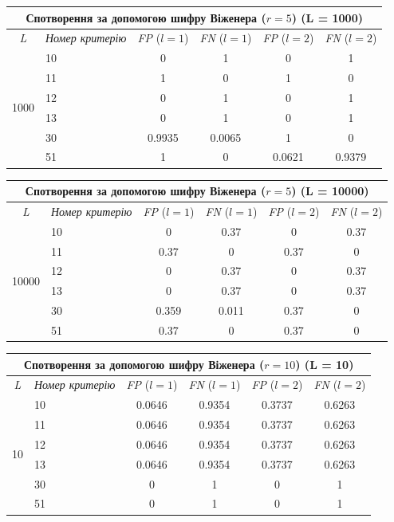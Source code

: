 \documentclass[a4paper,12pt]{article}
\begin{document}
\begin{center}
\renewcommand{\arraystretch}{1.2}
\setlength{\tabcolsep}{6pt}
\begin{tabular}{|c|l||c|c||c|c|}
\hline
\multicolumn{6}{|c|}{Спотворення за допомогою шифру Віженера ($r = 5$) (L = 1000)} \\
\hline
\textit{L} & \textit{Номер критерію} & \textit{FP} ($l=1$) & \textit{FN} ($l=1$) & \textit{FP} ($l=2$) & \textit{FN} ($l=2$) \\
\hline
\multirow{6}{*}{1000} & 10 & 0 & 1 & 0 & 1 \\
 & 11 & 1 & 0 & 1 & 0 \\
 & 12 & 0 & 1 & 0 & 1 \\
 & 13 & 0 & 1 & 0 & 1 \\
 & 30 & 0.9935 & 0.0065 & 1 & 0 \\
 & 51 & 1 & 0 & 0.0621 & 0.9379 \\
\hline
\end{tabular}
\end{center}

\begin{center}
\renewcommand{\arraystretch}{1.2}
\setlength{\tabcolsep}{6pt}
\begin{tabular}{|c|l||c|c||c|c|}
\hline
\multicolumn{6}{|c|}{Спотворення за допомогою шифру Віженера ($r = 5$) (L = 10000)} \\
\hline
\textit{L} & \textit{Номер критерію} & \textit{FP} ($l=1$) & \textit{FN} ($l=1$) & \textit{FP} ($l=2$) & \textit{FN} ($l=2$) \\
\hline
\multirow{6}{*}{10000} & 10 & 0 & 0.37 & 0 & 0.37 \\
 & 11 & 0.37 & 0 & 0.37 & 0 \\
 & 12 & 0 & 0.37 & 0 & 0.37 \\
 & 13 & 0 & 0.37 & 0 & 0.37 \\
 & 30 & 0.359 & 0.011 & 0.37 & 0 \\
 & 51 & 0.37 & 0 & 0.37 & 0 \\
\hline
\end{tabular}
\end{center}

\begin{center}
\renewcommand{\arraystretch}{1.2}
\setlength{\tabcolsep}{6pt}
\begin{tabular}{|c|l||c|c||c|c|}
\hline
\multicolumn{6}{|c|}{Спотворення за допомогою шифру Віженера ($r = 10$) (L = 10)} \\
\hline
\textit{L} & \textit{Номер критерію} & \textit{FP} ($l=1$) & \textit{FN} ($l=1$) & \textit{FP} ($l=2$) & \textit{FN} ($l=2$) \\
\hline
\multirow{6}{*}{10} & 10 & 0.0646 & 0.9354 & 0.3737 & 0.6263 \\
 & 11 & 0.0646 & 0.9354 & 0.3737 & 0.6263 \\
 & 12 & 0.0646 & 0.9354 & 0.3737 & 0.6263 \\
 & 13 & 0.0646 & 0.9354 & 0.3737 & 0.6263 \\
 & 30 & 0 & 1 & 0 & 1 \\
 & 51 & 0 & 1 & 0 & 1 \\
\hline
\end{tabular}
\end{center}
\end{document}

